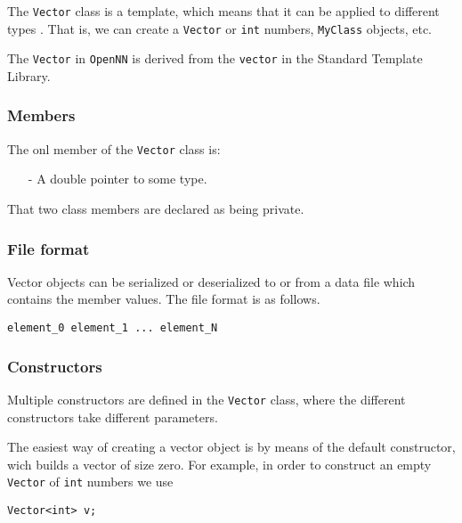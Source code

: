
The \lstinline"Vector" class is a template, which means that it
can be applied to different types \cite{Eckel2000}. That is, we
can create a \lstinline"Vector" or \lstinline"int" numbers, \lstinline"MyClass" objects, etc.

The \lstinline"Vector" in \texttt{OpenNN} is derived from the \lstinline"vector" in the Standard Template Library. 

\subsubsection*{Members}

The onl member of the \lstinline"Vector" class is:

\begin{itemize}
\item[-] A double pointer to some type. 
\end{itemize}

That two class members are declared as being private. 

\subsubsection*{File format}

Vector objects can be serialized or deserialized to or from a data file which contains the member values. The file format is as follows.

\begin{lstlisting}
element_0 element_1 ... element_N
\end{lstlisting}

\subsubsection*{Constructors}

Multiple constructors are defined in the \lstinline"Vector" class, where the different constructors take different parameters. 


The easiest way of creating a vector object is by means of the default constructor, wich builds a vector of size zero.
For example, in order to construct an empty \lstinline"Vector" of
\lstinline"int" numbers we use

\begin{lstlisting}
Vector<int> v;
\end{lstlisting}


